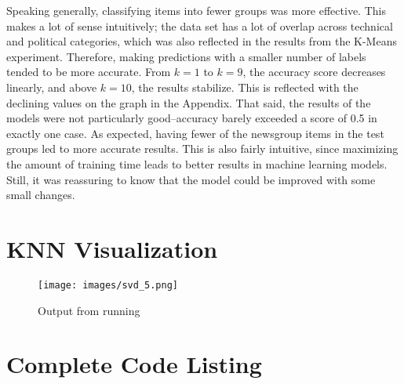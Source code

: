 \documentclass[11pt]{article}
\begin{document}
Speaking generally, classifying items into fewer groups was more effective.
This makes a lot of sense intuitively; the data set has a lot of overlap across technical and political categories, which was also reflected in the results from the K-Means experiment.
Therefore, making predictions with a smaller number of labels tended to be more accurate.
From $k=1$ to $k=9$, the accuracy score decreases linearly, and above $k=10$, the results stabilize.
This is reflected with the declining values on the graph in the  Appendix.
That said, the results of the models were not particularly good--accuracy barely exceeded a score of 0.5 in exactly one case.
As expected, having fewer of the newsgroup items in the test groups led to more accurate results.
This is also fairly intuitive, since maximizing the amount of training time leads to better results in machine learning models.
Still, it was reassuring to know that the model could be improved with some small changes.

\newpage
\begin{appendices}
\section{KNN Visualization} \label{outputs}

\begin{figure}[H]
\centering
\texttt{[image: images/svd\_5.png]}
\caption{Output from running}
\label{fig:out}
\end{figure}


\newpage
\section{Complete Code Listing} \label{codelist}
% 

\end{appendices}
  
\end{document}
